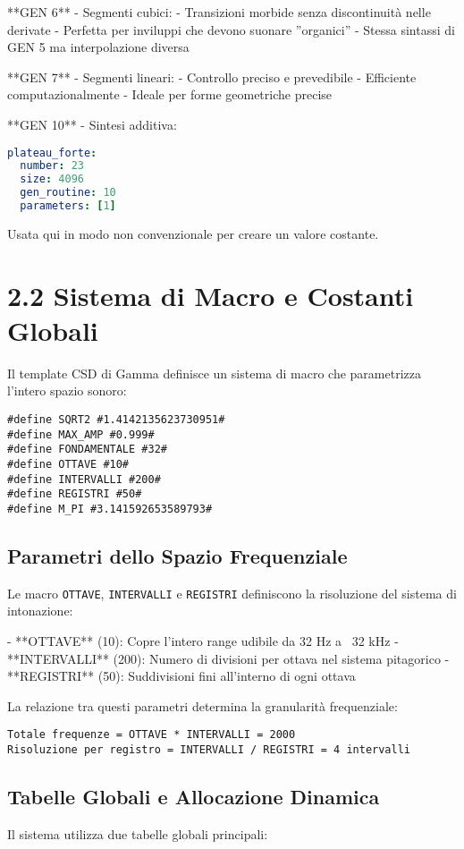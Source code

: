 **GEN 6** - Segmenti cubici:
- Transizioni morbide senza discontinuità nelle derivate
- Perfetta per inviluppi che devono suonare ''organici''
- Stessa sintassi di GEN 5 ma interpolazione diversa

**GEN 7** - Segmenti lineari:
- Controllo preciso e prevedibile
- Efficiente computazionalmente
- Ideale per forme geometriche precise

**GEN 10** - Sintesi additiva:
\begin{lstlisting}[language=Yaml]
plateau_forte:
  number: 23
  size: 4096
  gen_routine: 10
  parameters: [1]
\end{lstlisting}
Usata qui in modo non convenzionale per creare un valore costante.
\section{2.2 Sistema di Macro e Costanti Globali}
Il template CSD di Gamma definisce un sistema di macro che parametrizza l'intero spazio sonoro:

\begin{lstlisting}[language=Csound]
#define SQRT2 #1.4142135623730951#
#define MAX_AMP #0.999#
#define FONDAMENTALE #32#
#define OTTAVE #10#
#define INTERVALLI #200#
#define REGISTRI #50#
#define M_PI #3.141592653589793#
\end{lstlisting}
\subsection{Parametri dello Spazio Frequenziale}
Le macro \texttt{OTTAVE}, \texttt{INTERVALLI} e \texttt{REGISTRI} definiscono la risoluzione del sistema di intonazione:

- **OTTAVE** (10): Copre l'intero range udibile da 32 Hz a ~32 kHz
- **INTERVALLI** (200): Numero di divisioni per ottava nel sistema pitagorico
- **REGISTRI** (50): Suddivisioni fini all'interno di ogni ottava

La relazione tra questi parametri determina la granularità frequenziale:
\begin{lstlisting}
Totale frequenze = OTTAVE * INTERVALLI = 2000
Risoluzione per registro = INTERVALLI / REGISTRI = 4 intervalli
\end{lstlisting}
\subsection{Tabelle Globali e Allocazione Dinamica}
Il sistema utilizza due tabelle globali principali:

